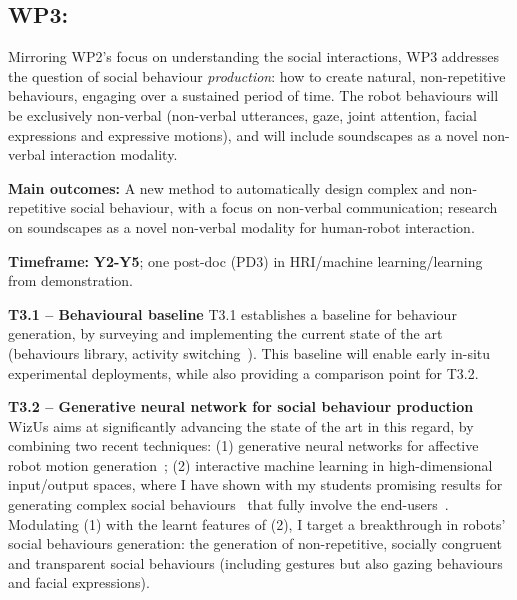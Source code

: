 \documentclass[11pt,a4paper]{report}
\newcommand{\project}{WizUs\xspace}
\begin{document}
\subsection{WP3: \textbf{\wpThree}} 

Mirroring WP2's focus on understanding the social interactions, WP3 addresses the
question of social behaviour \emph{production}: how to create natural,
non-repetitive behaviours, engaging over a sustained period of time. The robot
behaviours will be exclusively non-verbal (non-verbal utterances, gaze, joint
attention, facial expressions and expressive motions), and will include
soundscapes as a novel non-verbal interaction modality.

\begin{framed}

    \textbf{Main outcomes:} A new method to automatically design complex and
    non-repetitive social behaviour, with a focus on non-verbal communication;
    research on soundscapes as a novel non-verbal modality for human-robot
    interaction.

    \textbf{Timeframe:} \textbf{Y2-Y5}; one post-doc (PD3) in HRI/machine learning/learning from
demonstration.

\end{framed}

\textbf{T3.1 -- Behavioural baseline} T3.1 establishes a baseline for behaviour
generation, by surveying and implementing the current state of the art
(behaviours library, activity switching~\cite{coninx2016towards}). This
baseline will enable early in-situ experimental deployments, while also
providing a comparison point for T3.2.

\textbf{T3.2 -- Generative neural network for social behaviour production}
\project aims at significantly advancing the state of the art in this regard, by
combining two recent techniques: (1) generative neural networks for affective
robot motion generation~\cite{marmpena2019generating,suguitan2020moveae}; (2) interactive machine
learning in high-dimensional input/output spaces, where I have shown with my
students promising results for generating complex social
behaviours~\cite{senft2019teaching, winkle2020couch} that fully involve the
end-users~\cite{winkle2018social}. Modulating (1) with the learnt features of
(2), I target a breakthrough in robots' social behaviours generation: the
generation of non-repetitive, socially congruent and transparent social
behaviours (including gestures but also gazing behaviours and facial
expressions).
\end{document}
